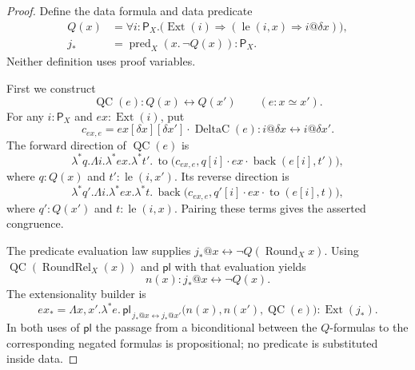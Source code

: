 \begin{proof}
Define the data formula and data predicate
\begin{align*}
 Q(x)&=\forall i:\mathsf P_X.\bigl(\operatorname{Ext}(i)
           \Rightarrow(\operatorname{le}(i,x)\Rightarrow i@\delta x)\bigr),\\
 j_*&=\operatorname{pred}_X(x.\,\neg Q(x)):\mathsf P_X.
\end{align*}
Neither definition uses proof variables.

First we construct
\[
 \operatorname{QC}(e):Q(x)\leftrightarrow Q(x')
 \qquad(e:x\simeq x').
\]
For any $i:\mathsf P_X$ and $ex:\operatorname{Ext}(i)$, put
\[
 c_{ex,e}=ex[\delta x][\delta x']\cdot\operatorname{DeltaC}(e)
               :i@\delta x\leftrightarrow i@\delta x'.
\]
The forward direction of $\operatorname{QC}(e)$ is
\[
 \lambda^*q.\Lambda i.\lambda^*ex.\lambda^*t'.\,
 \operatorname{to}\bigl(c_{ex,e},
       q[i]\cdot ex\cdot\operatorname{back}(e[i],t')\bigr),
\]
where $q:Q(x)$ and $t':\operatorname{le}(i,x')$.
Its reverse direction is
\[
 \lambda^*q'.\Lambda i.\lambda^*ex.\lambda^*t.\,
 \operatorname{back}\bigl(c_{ex,e},
       q'[i]\cdot ex\cdot\operatorname{to}(e[i],t)\bigr),
\]
where $q':Q(x')$ and $t:\operatorname{le}(i,x)$.
Pairing these terms gives the asserted congruence.

The predicate evaluation law supplies
$j_*@x\leftrightarrow\neg Q(\operatorname{Round}_Xx)$.
Using $\operatorname{QC}(\operatorname{RoundRel}_X(x))$ and
$\mathsf{pl}$ with that evaluation yields
\begin{equation}
 n(x):j_*@x\leftrightarrow\neg Q(x).
 \label{rel-negative-evaluation}
\end{equation}
The extensionality builder is
\[
 ex_*=
 \Lambda x,x'.\lambda^*e.\,
 \mathsf{pl}_{\,j_*@x\leftrightarrow j_*@x'}
       \bigl(n(x),n(x'),\operatorname{QC}(e)\bigr)
       :\operatorname{Ext}(j_*).
\]
In both uses of $\mathsf{pl}$ the passage from a biconditional
between the $Q$-formulas to the corresponding negated formulas is
propositional; no predicate is substituted inside data.


\end{proof}
